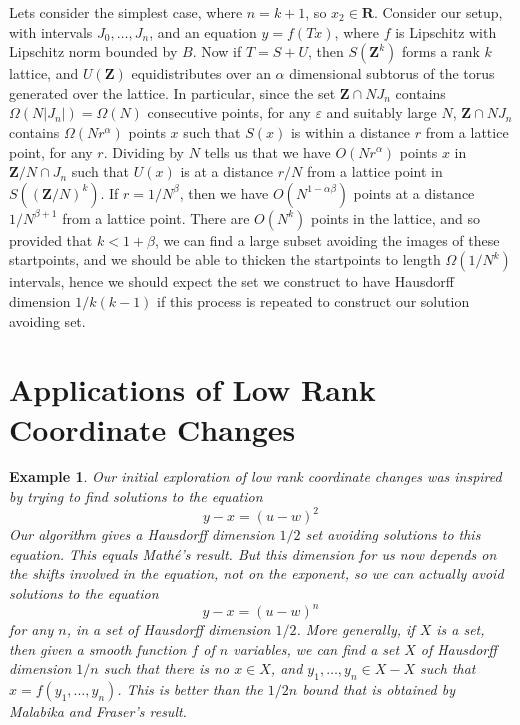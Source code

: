 \documentclass{report}
\theoremstyle{plain}
\newtheorem*{example}{Example}
\theoremstyle{plain}
\begin{document}
Lets consider the simplest case, where $n = k+1$, so $x_2 \in \mathbf{R}$. Consider our setup, with intervals $J_0, \dots, J_n$, and an equation $y = f(Tx)$, where $f$ is Lipschitz with Lipschitz norm bounded by $B$. Now if $T = S + U$, then $S(\mathbf{Z}^k)$ forms a rank $k$ lattice, and $U(\mathbf{Z})$ equidistributes over an $\alpha$ dimensional subtorus of the torus generated over the lattice. In particular, since the set $\mathbf{Z} \cap NJ_n$ contains $\Omega(N |J_n|) = \Omega(N)$ consecutive points, for any $\varepsilon$ and suitably large $N$, $\mathbf{Z} \cap NJ_n$ contains $\Omega(Nr^\alpha)$ points $x$ such that $S(x)$ is within a distance $r$ from a lattice point, for any $r$. Dividing by $N$ tells us that we have $O(Nr^\alpha)$ points $x$ in $\mathbf{Z}/N \cap J_n$ such that $U(x)$ is at a distance $r/N$ from a lattice point in $S((\mathbf{Z}/N)^k)$. If $r = 1/N^\beta$, then  we have $O(N^{1-\alpha\beta})$ points at a distance $1/N^{\beta + 1}$ from a lattice point. There are $O(N^k)$ points in the lattice, and so provided that $k < 1 + \beta$, we can find a large subset avoiding the images of these startpoints, and we should be able to thicken the startpoints to length $\Omega(1/N^k)$ intervals, hence we should expect the set we construct to have Hausdorff dimension $1/k(k-1)$ if this process is repeated to construct our solution avoiding set.

\section{Applications of Low Rank Coordinate Changes}

\begin{example}
Our initial exploration of low rank coordinate changes was inspired by trying to find solutions to the equation
%
\[ y - x = (u - w)^2 \]
%
Our algorithm gives a Hausdorff dimension $1/2$ set avoiding solutions to this equation. This equals Math\'{e}'s result. But this dimension for us now depends on the shifts involved in the equation, not on the exponent, so we can actually avoid solutions to the equation
%
\[ y - x = (u - w)^n \]
%
for any $n$, in a set of Hausdorff dimension $1/2$. More generally, if $X$ is a set, then given a smooth function $f$ of $n$ variables, we can find a set $X$ of Hausdorff dimension $1/n$ such that there is no $x \in X$, and $y_1, \dots, y_n \in X - X$ such that $x = f(y_1, \dots, y_n)$. This is better than the $1/2n$ bound that is obtained by Malabika and Fraser's result.
\end{example}
\end{document}
